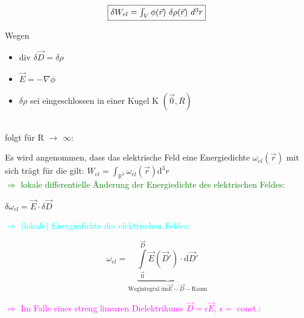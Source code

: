 \documentclass[]{article}
\newcommand{\R}{\ensuremath{\mathbb R}}
\newcommand{\dd}{\ensuremath{\text{d}}}
\begin{document}
	\begin{displaymath} 
		\fbox{$\delta W_{el} = \int_V \phi (\vec{r}) \ \delta \rho (\vec{r}) \ d^3 r$}
	\end{displaymath}
	
	Wegen 
		\begin{boxedminipage}[yellow]{9cm}
			\begin{itemize}
				\item 
					div $\delta \vec{D}=\delta \rho$
				\item 
					$\vec{E}=-\nabla \phi$
				\item 
					$\delta \rho$ sei eingeschlossen in einer Kugel K $(\vec{0},R)$ 
			\end{itemize} 
		\end{boxedminipage}

	\ \\ folgt für R $\rightarrow$ $\infty$: \qquad{}

\newpage

	Es wird angenommen, dass das elektrische Feld eine Energiedichte $\omega_{el}(\vec{r})$ mit sich trägt für die gilt: $W_{el}=\int_{\R^3} \omega_{el}(\vec{r})\dd^3 r$ 
	\\\textcolor{green}{$\Rightarrow$ lokale differentielle Änderung der Energiedichte des elektrischen Feldes:}

	\begin{center}
		\begin{boxedminipage}[green]{3cm}
			$\delta \omega_{el}=\vec{E}\cdot \delta \vec{D}$
		\end{boxedminipage}
	\end{center}

	\textcolor{cyan}{$\Rightarrow$ (lokale)  Energiedichte des elektrischen Feldes:}
	
	\begin{center}
		\begin{boxedminipage}[cyan]{6cm}
			\begin{displaymath}
				\omega_{el}=\underbrace{\int\limits_{\vec{0}}^{\vec{D}}\vec{E}(\vec{D}')\cdot \dd \vec{D}'}_{\text{Wegintegral  im} \vec{E}-\vec{D}-\text{Raum}}
			\end{displaymath}
		\end{boxedminipage}
	\end{center}
	
	\textcolor{magenta}{$\Rightarrow$ Im Falle eines streng linearen Dielektrikums $\vec{D}=\epsilon\vec{E}$, $\epsilon=$ const.:}
\end{document}
